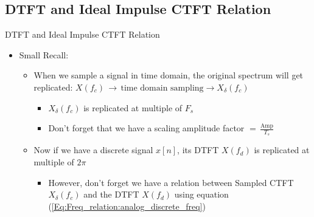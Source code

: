 \subsection{DTFT and Ideal Impulse CTFT Relation}
\begin{frame}[t]{DTFT and Ideal Impulse CTFT Relation}

\begin{itemize}

\item Small Recall:

	\begin{itemize}
	\item When we sample a signal in time domain, the original spectrum will get replicated: $X(f_c) \, \rightarrow \, \text{time domain sampling} \rightarrow X_{\delta}(f_c)$
	
		\begin{itemize}
		\item $X_{\delta}(f_c)$ is replicated at multiple of $F_s$ 
		\item Don't forget that we have a scaling amplitude factor $= \, \displaystyle\frac{\text{Amp}}{T_s}$
		\end{itemize}
	
	\item Now if we have a discrete signal $x[n]$, its DTFT $X(f_d)$ is replicated at multiple of $2 \pi$
	
		\begin{itemize}
		\item However, don't forget we have a relation between Sampled CTFT $X_{\delta}(f_c)$ and the DTFT $X(f_d)$ using equation (\autoref{Eq:Freq_relation:analog_discrete_freq})
			
	
	\end{itemize}

\end{itemize}

\end{itemize}

\end{frame}
